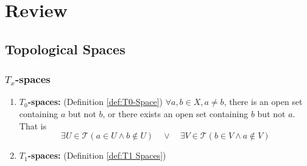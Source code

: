 \documentclass[../main.tex]{subfiles}
\begin{document}
\chapter*{Review}

\section*{Topological Spaces}
\subsection*{$T_x$-spaces}
\begin{enumerate}
\item \textbf{$T_0$-spaces: } (Definition \ref{def:T0-Space}) $\forall a,b\in X, a\neq b$, there is an open set containing $a$ but not $b$, or there exists an open set containing $b$ but not $a$. That is
\begin{equation*}
\exists U\in \mathcal{T}(a\in U \land b\notin U)\quad \lor\quad \exists V\in \mathcal{T}(b\in V \land a\notin V)
\end{equation*}

\item \textbf{$T_1$-spaces: } (Definition \ref{def:T1 Spaces}) 
\end{enumerate}
\end{document}
